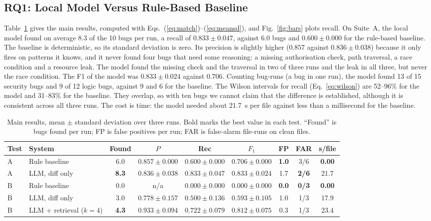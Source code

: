 \documentclass[12pt,onecolumn,draftclsnofoot]{IEEEtran}
\begin{document}
\subsection{RQ1: Local Model Versus Rule-Based Baseline}
Table~\ref{tab:main} gives the main results, computed with Eqs.~(\ref{eq:match})--(\ref{eq:meansd}), and Fig.~\ref{fig:bars} plots recall. On Suite~A, the local model found on average 8.3 of the 10 bugs per run, a recall of $0.833\pm0.047$, against 6.0 bugs and $0.600\pm0.000$ for the rule-based baseline. The baseline is deterministic, so its standard deviation is zero. Its precision is slightly higher ($0.857$ against $0.836\pm0.038$) because it only fires on patterns it knows, and it never found four bugs that need some reasoning: a missing authorisation check, path traversal, a race condition and a resource leak. The model found the missing check and the traversal in two of three runs and the leak in all three, but never the race condition. The F1 of the model was $0.833\pm0.024$ against $0.706$. Counting bug-runs (a bug in one run), the model found 13 of 15 security bugs and 9 of 12 logic bugs, against 9 and 6 for the baseline. The Wilson intervals for recall (Eq.~\ref{eq:wilson}) are 52--96\% for the model and 31--83\% for the baseline. They overlap, so with ten bugs we cannot claim that the difference is established, although it is consistent across all three runs. The cost is time: the model needed about 21.7~s per file against less than a millisecond for the baseline.

\begin{table}[!t]
\caption{Main results, mean $\pm$ standard deviation over three runs. Bold marks the best value in each test. ``Found'' is bugs found per run; FP is false positives per run; FAR is false-alarm file-runs on clean files.}\label{tab:main}
\centering\scriptsize\setlength{\tabcolsep}{3pt}
\renewcommand{\arraystretch}{1.15}
\begin{tabular}{@{}llccccccc@{}}
\toprule
Test & System & Found & $P$ & Rec & $F_1$ & FP & FAR & s/file \\
\midrule
A & Rule baseline & 6.0 & $\mathbf{0.857\pm0.000}$ & $0.600\pm0.000$ & $0.706\pm0.000$ & \textbf{1.0} & 3/6 & \textbf{0.00} \\
A & LLM, diff only & \textbf{8.3} & $0.836\pm0.038$ & $\mathbf{0.833\pm0.047}$ & $\mathbf{0.833\pm0.024}$ & 1.7 & \textbf{2/6} & 21.7 \\
\midrule
B & Rule baseline & 0.0 & n/a & $0.000\pm0.000$ & $0.000\pm0.000$ & \textbf{0.0} & \textbf{0/3} & \textbf{0.00} \\
B & LLM, diff only & 3.0 & $0.778\pm0.157$ & $0.500\pm0.136$ & $0.593\pm0.105$ & 1.0 & 1/3 & 17.9 \\
B & LLM + retrieval ($k=4$) & \textbf{4.3} & $\mathbf{0.933\pm0.094}$ & $\mathbf{0.722\pm0.079}$ & $\mathbf{0.812\pm0.075}$ & 0.3 & 1/3 & 23.4 \\
\bottomrule
\end{tabular}
\end{table}
\end{document}
